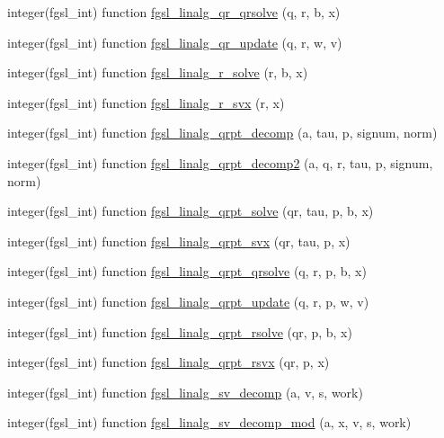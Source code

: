 \begin{DoxyCompactItemize}
\item 
integer(fgsl\+\_\+int) function \hyperlink{linalg_8finc_a36ef785b86019f22ea32594b5f8060af}{fgsl\+\_\+linalg\+\_\+qr\+\_\+qrsolve} (q, r, b, x)
\item 
integer(fgsl\+\_\+int) function \hyperlink{linalg_8finc_a50523f2137f82ac54ac5f406c4792799}{fgsl\+\_\+linalg\+\_\+qr\+\_\+update} (q, r, w, v)
\item 
integer(fgsl\+\_\+int) function \hyperlink{linalg_8finc_a743b1e1ab7afa142625cd541cffc2147}{fgsl\+\_\+linalg\+\_\+r\+\_\+solve} (r, b, x)
\item 
integer(fgsl\+\_\+int) function \hyperlink{linalg_8finc_abdf5b79e92c6109a0f364962ebcae949}{fgsl\+\_\+linalg\+\_\+r\+\_\+svx} (r, x)
\item 
integer(fgsl\+\_\+int) function \hyperlink{linalg_8finc_a69ea60b78e3baf963ededde50ad72836}{fgsl\+\_\+linalg\+\_\+qrpt\+\_\+decomp} (a, tau, p, signum, norm)
\item 
integer(fgsl\+\_\+int) function \hyperlink{linalg_8finc_a3257e315b9925b49e4c4795631c90808}{fgsl\+\_\+linalg\+\_\+qrpt\+\_\+decomp2} (a, q, r, tau, p, signum, norm)
\item 
integer(fgsl\+\_\+int) function \hyperlink{linalg_8finc_aaa778ea46e4bbefce215f2341620507d}{fgsl\+\_\+linalg\+\_\+qrpt\+\_\+solve} (qr, tau, p, b, x)
\item 
integer(fgsl\+\_\+int) function \hyperlink{linalg_8finc_a79ba5beb414eb0cc23e02a005ee8aa8a}{fgsl\+\_\+linalg\+\_\+qrpt\+\_\+svx} (qr, tau, p, x)
\item 
integer(fgsl\+\_\+int) function \hyperlink{linalg_8finc_a9601978a5c17c13e34d19ddb3d5af6bc}{fgsl\+\_\+linalg\+\_\+qrpt\+\_\+qrsolve} (q, r, p, b, x)
\item 
integer(fgsl\+\_\+int) function \hyperlink{linalg_8finc_a65c186f60ce2d97d132e3df57c18ba35}{fgsl\+\_\+linalg\+\_\+qrpt\+\_\+update} (q, r, p, w, v)
\item 
integer(fgsl\+\_\+int) function \hyperlink{linalg_8finc_a632f5517167f0e2fa649ad9ab2f3d4d0}{fgsl\+\_\+linalg\+\_\+qrpt\+\_\+rsolve} (qr, p, b, x)
\item 
integer(fgsl\+\_\+int) function \hyperlink{linalg_8finc_a58f84af1a42b1026a971543a061f45f8}{fgsl\+\_\+linalg\+\_\+qrpt\+\_\+rsvx} (qr, p, x)
\item 
integer(fgsl\+\_\+int) function \hyperlink{linalg_8finc_ab47674d931fc561a5417410ec464e758}{fgsl\+\_\+linalg\+\_\+sv\+\_\+decomp} (a, v, s, work)
\item 
integer(fgsl\+\_\+int) function \hyperlink{linalg_8finc_af9767f953466e17a78a835c1fb21e588}{fgsl\+\_\+linalg\+\_\+sv\+\_\+decomp\+\_\+mod} (a, x, v, s, work)

\end{DoxyCompactItemize}
